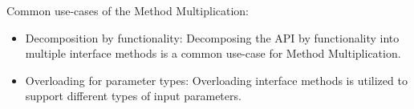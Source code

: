 Common use-cases of the Method Multiplication:

\begin{itemize}
    \item Decomposition by functionality:
    Decomposing the API by functionality into multiple interface methods is a common use-case for Method Multiplication.
    \item Overloading for parameter types:
    Overloading interface methods is utilized to support different types of input parameters.
\end{itemize}

